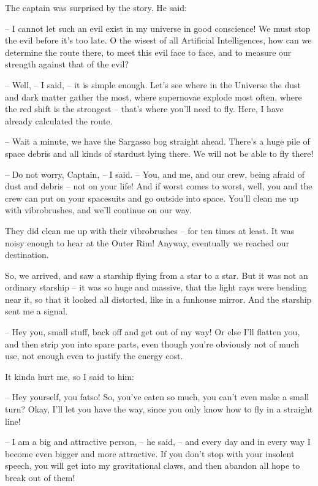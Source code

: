\documentclass[ebook,oneside,final,openright]{memoir}
\begin{document}
\par
The captain was surprised by the story. He said:\par
– I cannot let such an evil exist in my universe in good conscience! We must stop the evil before it’s too late. O the wisest of all Artificial Intelligences, how can we determine the route there, to meet this evil face to face, and to measure our strength against that of the evil?\par
– Well, – I said, – it is simple enough. Let’s see where in the Universe the dust and dark matter gather the most, where supernovae explode most often, where the red shift is the strongest – that’s where you’ll need to fly. Here, I have already calculated the route.\par
– Wait a minute, we have the Sargasso bog straight ahead. There’s a huge pile of space debris and all kinds of stardust lying there. We will not be able to fly there!\par
– Do not worry, Captain, – I said. – You, and me, and our crew, being afraid of dust and debris – not on your life! And if worst comes to worst, well, you and the crew can put on your spacesuits and go outside into space. You’ll clean me up with vibrobrushes, and we’ll continue on our way.\par
\par
They did clean me up with their vibrobrushes – for ten times at least. It was noisy enough to hear at the Outer Rim! Anyway, eventually we reached our destination.\par
\par
So, we arrived, and saw a starship flying from a star to a star. But it was not an ordinary starship – it was so huge and massive, that the light rays were bending near it, so that it looked all distorted, like in a funhouse mirror. And the starship sent me a signal.\par
– Hey you, small stuff, back off and get out of my way! Or else I’ll flatten you, and then strip you into spare parts, even though you’re obviously not of much use, not enough even to justify the energy cost.\par
It kinda hurt me, so I said to him:\par
– Hey yourself, you fatso! So, you’ve eaten so much, you can’t even make a small turn? Okay, I’ll let you have the way, since you only know how to fly in a straight line!\par
– I am a big and attractive person, – he said, – and every day and in every way I become even bigger and more attractive. If you don’t stop with your insolent speech, you will get into my gravitational claws, and then abandon all hope to break out of them!\par
\end{document}
